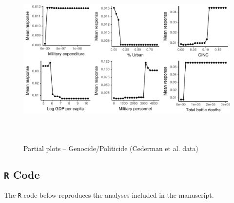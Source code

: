 \begin{figure}[H]
    \centering
    \includegraphics[width=\textwidth, height=9cm]{images/drfdpp7a.pdf}
    \caption{Partial plots -- Genocide/Politicide (Cederman et al. data)}
    \label{fig:my_label}
\end{figure}

\newpage

\subsection{\texttt{R} Code}
\label{sec:mk-code}

The \texttt{R} code below reproduces the analyses included in the manuscript.

